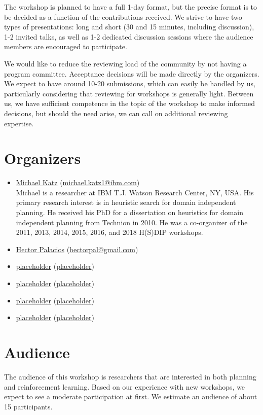 \documentclass[10pt]{article}
\begin{document}
The workshop is planned to have a full 1-day format, but the precise format is
to be decided as a function of the contributions received. We strive to have two
types of presentations: long and short (30 and 15 minutes, including
discussion), 1-2 invited talks, as well as 1-2 dedicated discussion sessions
where the audience members are encouraged to participate.

We would like to reduce the reviewing load of the community by not having a
program committee. Acceptance decisions will be made directly by the organizers.
We expect to have around 10-20 submissions, which can easily be handled by us,
particularly considering that reviewing for workshops is generally light.
Between us, we have sufficient competence in the topic of the workshop to make
informed decisions, but should the need arise, we can call on additional
reviewing expertise.

\section*{Organizers}

\begin{itemize}



\item \href{https://resedit.watson.ibm.com/researcher/view.php?person=ibm-Michael.Katz1}{Michael Katz}
 (\href{mailto:michael.katz1@ibm.com}{michael.katz1@ibm.com})\\
 Michael is a researcher at IBM T.J. Watson Research Center, NY, USA. His
 primary research interest is in heuristic search for domain independent planning.
 He received his PhD for a dissertation on heuristics for domain independent
 planning from Technion in 2010.
 He was a co-organizer of the 2011, 2013, 2014, 2015, 2016, and 2018 H(S)DIP
 workshops.


\item \href{http://hectorpalacios.net/}{Hector Palacios}
  (\href{mailto:hectorpal@gmail.com}{hectorpal@gmail.com})\\

\item \href{placeholder}{placeholder}
  (\href{mailto:placeholder}{placeholder})\\

\item \href{placeholder}{placeholder}
  (\href{mailto:placeholder}{placeholder})\\

\item \href{placeholder}{placeholder}
  (\href{mailto:placeholder}{placeholder})\\

\item \href{placeholder}{placeholder}
  (\href{mailto:placeholder}{placeholder})\\

  
\end{itemize}

\section*{Audience}

The audience of this workshop is researchers that are interested in both
planning and reinforcement learning.
%
Based on our experience with new workshops, we expect to see a moderate
participation at first. We estimate an audience of about 15 participants.  
\end{document}
